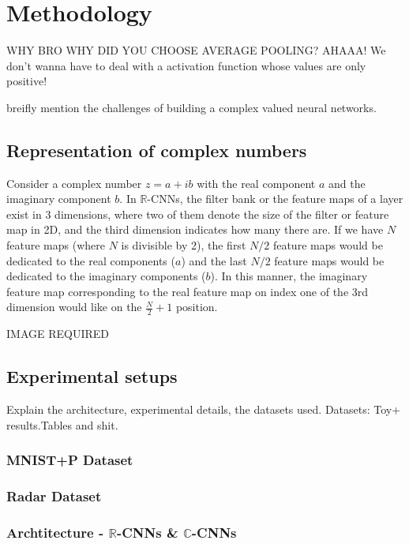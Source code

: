 \chapter{Methodology} \label{chap:methodology}
 
 WHY BRO WHY DID YOU CHOOSE AVERAGE POOLING?
 AHAAA!  We don't wanna have to deal with a activation function whose values are only positive!
 
 breifly mention the challenges of building a complex valued neural networks. 
 
 \section{Representation of complex numbers}
 Consider a complex number $z=a+ib$ with the real component $a$ and the imaginary component $b$. In $\mathbb{R}$-CNNs, the filter bank or the feature maps of a layer exist in 3 dimensions, where two of them denote the size of the filter or feature map in 2D, and the third dimension indicates how many there are. If we have $N$ feature maps (where $N$ is divisible by 2), the first $N/2$ feature maps would be dedicated to the real components ($a$) and the last $N/2$ feature maps would be dedicated to the imaginary components ($b$). In this manner, the imaginary feature map corresponding to the real feature map on index one of the 3rd dimension would like on the $\frac{N}{2} +1$ position.
 
 IMAGE REQUIRED
 
 \section{Experimental setups}
 Explain the architecture, experimental details, the datasets used. Datasets: Toy+ results.Tables and shit.
 
 \subsection{MNIST+P Dataset}
 
 \subsection{Radar Dataset}
 
 \subsection{Archtitecture - $\mathbb{R}$-CNNs \& $\mathbb{C}$-CNNs}
 
 
 